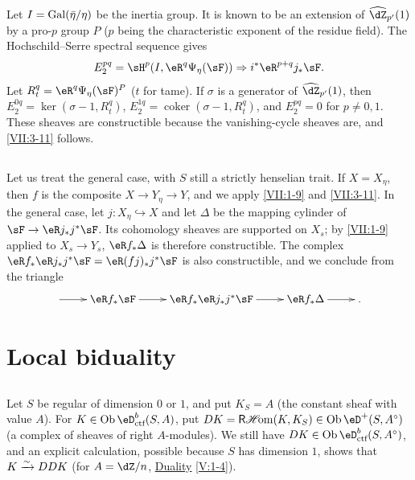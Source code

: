 Let $I=\operatorname{Gal}(\bar\eta/\eta)$ be the inertia group. It is known to be an
extension of $\widehat\dZ_{p'}(1)$ by a pro-$p$ group $P$ ($p$ being the
characteristic exponent of the residue field). The Hochschild--Serre spectral
sequence gives
\[
  E_2^{p q} = \sH^p(I,\eR^q\Psi_\eta(\sF))\Rightarrow i^\ast \eR^{p+q}j_\ast\sF \text{.} 
\]
Let $R_t^q = \eR^q\Psi_\eta(\sF)^P$ ($t$ for tame). If $\sigma$ is a
generator of $\widehat\dZ_{p'}(1)$, then
$E_2^{0 q} = \ker(\sigma-1,R_t^q)$,
$E_2^{1 q} = \operatorname{coker}(\sigma-1,R_t^q)$, and $E_2^{p q} = 0$ for
$p\ne 0,1$. These sheaves are constructible because the vanishing-cycle
sheaves are, and \ref{VII:3-11} follows.






\subsection{}\label{VII:3-12}

Let us treat the general case, with $S$ still a strictly henselian trait. If
$X=X_\eta$, then $f$ is the composite $X\to Y_\eta \to Y$, and we apply
\ref{VII:1-9} and \ref{VII:3-11}. In the general case, let
$j:X_\eta\hookrightarrow X$ and let $\Delta$ be the mapping cylinder of
$\sF \to \eR j_\ast j^\ast \sF$. Its cohomology sheaves are supported on
$X_s$; by \ref{VII:1-9} applied to $X_s \to Y_s$,
$\eR f_\ast \Delta$ is therefore constructible. The complex
$\eR f_\ast \eR j_\ast j^\ast \sF = \eR(f j)_\ast j^\ast \sF$ is also
constructible, and we conclude from the triangle
\[\xymatrix{
  \ar[r] 
    & \eR f_\ast \sF \ar[r] 
    & \eR f_\ast \eR j_\ast j^\ast \sF \ar[r] 
    & \eR f_\ast \Delta \ar[r] 
    & \text{.} 
}\]










\section{Local biduality}\label{VII:4}






\subsection{}\label{VII:4-1}

Let $S$ be regular of dimension $0$ or $1$, and put $K_S=A$ (the constant
sheaf with value $A$). For $K\in\ob\eD_\text{ctf}^b(S,A)$, put
$D K=\rHom(K,K_S)\in\ob\eD^+(S,A^\circ)$ (a complex of sheaves of right
$A$-modules). We still have $D K\in\ob\eD_\text{ctf}^b(S,A^\circ)$, and an explicit
calculation, possible because $S$ has dimension $1$, shows that
$K\xrightarrow\sim D D K$ (for $A=\dZ/n$, \hyperref[V]{Duality} \ref{V:1-4}).





